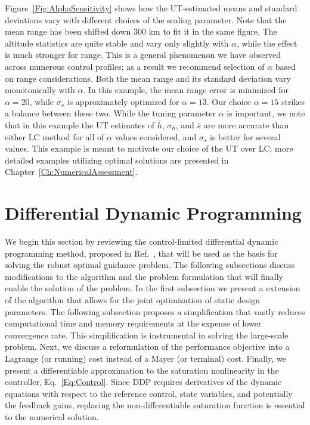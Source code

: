 Figure~\ref{Fig:AlphaSensitivity} shows how the UT-estimated means and standard deviations vary with different choices of the scaling parameter. Note that the mean range has been shifted down 300 km to fit it in the same figure. The altitude statistics are quite stable and vary only slightly with $\alpha$, while the effect is much stronger for range. This is a general phenomenon we have observed across numerous control profiles; as a result we recommend selection of $\alpha$ based on range considerations. 
Both the mean range and its standard deviation vary monotonically with $\alpha$. In this example, the mean range error is minimized for $\alpha = 20$, while $\sigma_s$ is approximately optimized for $\alpha = 13$. Our choice $\alpha=15$ strikes a balance between these two. 
While the tuning parameter $\alpha$ is important, we note that in this example the UT estimates of $\bar{h},\,\sigma_h$, and $\bar{s}$ are more accurate than either LC method for all of $\alpha$ values considered, and $\sigma_s$ is better for several values.
This example is meant to motivate our choice of the UT over LC; more detailed examples utilizing optimal solutions are presented in Chapter~\ref{Ch:NumericalAssessment}. 


\section{Differential Dynamic Programming}\label{Sec:DDP}
We begin this section by reviewing the control-limited differential dynamic programming method, proposed in Ref.~\cite{DDP_ControlLimited}, that will be used as the basis for solving the robust optimal guidance problem. The following subsections discuss modifications to the algorithm and the problem formulation that will finally enable the solution of the problem. In the first subsection we present a extension of the algorithm that allows for the joint optimization of static design parameters. The following subsection proposes a simplification that vastly reduces computational time and memory requirements at the expense of lower convergence rate. This simplification is instrumental in solving the large-scale problem. Next, we discuss a reformulation of the performance objective into a Lagrange (or running) cost instead of a Mayer (or terminal) cost. Finally, we present a differentiable approximation to the saturation nonlinearity in the controller, Eq.~\eqref{Eq:Control}. Since DDP requires derivatives of the dynamic equations with respect to the reference control, state variables, and potentially the feedback gains, replacing the non-differentiable saturation function is essential to the numerical solution.

